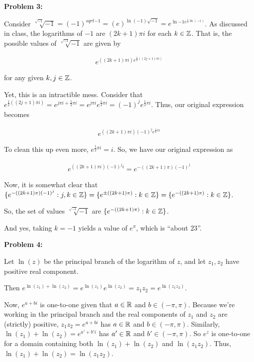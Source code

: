 \documentclass[a4paper,12pt]{article}
\begin{document}
\shunt

{\bf Problem 3:}

Consider $\sqrt[\sqrt{-1}]{-1} = (-1)^{sqrt{-1}} = (e)^{\ln(-1)\sqrt{-1}} = e^{\ln{-1}e^{\frac{1}{2}\ln(-1)}}$. As discussed in class, the logarithms of $-1$ are $(2k+1)\pi i$ for each $k \in \mathbb{Z}$. That is, the possible values of $\sqrt[\sqrt{-1}]{-1}$ are given by 

\begin{align*}
e^{((2k+1)\pi i)e^{\frac{1}{2}((2j+1)\pi i)}} 
\end{align*} %

for any given $k, j \in \mathbb{Z}$.

Yet, this is an intractible mess. Consider that $e^{\frac{1}{2}((2j+1)\pi i)} = e^{j \pi i + \frac{1}{2} \pi i} = e^{j\pi i} e^{\frac{1}{2} \pi i} = (-1)^j e^{\frac{1}{2} \pi i}$. Thus, our original expression becomes

\begin{align*}
e^{((2k+1)\pi i)(-1)^j e^{\frac{1}{2} \pi i}} 
\end{align*}

To clean this up even more, $e^{\frac{1}{2} \pi i}=i$. So, we have our original expression as 

\begin{align*}
e^{((2k+1)\pi i)(-1)^j i}  = e^{-((2k+1)\pi)(-1)^j}
\end{align*}

Now, it is somewhat clear that $\{e^{-((2k+1)\pi)(-1)^j}: j, k \in \mathbb{Z} \} = \{ e^{ \pm ((2k+1)\pi)}: k \in \mathbb{Z} \} = \{e^{-((2k+1)\pi)}: k \in \mathbb{Z} \}$.

So, the set of values $\sqrt[\sqrt{-1}]{-1}$ are $\{e^{-((2k+1)\pi)}: k \in \mathbb{Z} \}$. 

And yes, taking $k=-1$ yields a value of $e^\pi$, which is ``about $23$''.

\shunt

{\bf Problem 4:}

Let $\ln(z)$ be the principal branch of the logarithm of $z$, and let $z_1, z_2$ have positive real component.

Then $e^{\ln(z_1)+\ln(z_2)} = e^{\ln(z_1)}e^{\ln(z_2)} = z_1z_2 = e^{\ln(z_1z_2)}$.

Now, $e^{a+bi}$ is one-to-one given that $a \in \mathbb{R}$ and $b \in (-\pi,\pi)$. Because we're working in the principal branch and the real components of $z_1$ and $z_2$ are (strictly) positive, $z_1z_2 = e^{a+bi}$ has $a \in \mathbb{R}$ and $b \in (-\pi,\pi)$. Similarly, $\ln(z_1)+\ln(z_2) = e^{a'+b'i}$ has $a' \in \mathbb{R}$ and $b' \in (-\pi, \pi)$. So $e^{z}$ is one-to-one for a domain containing both $\ln(z_1)+\ln(z_2)$ and $\ln(z_1z_2)$. Thus, $\ln(z_1)+\ln(z_2) = \ln(z_1z_2)$.
\end{document}
